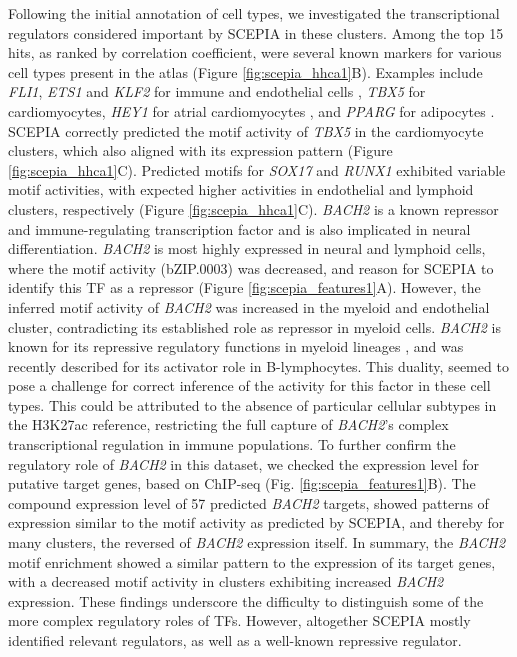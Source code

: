 Following the initial annotation of cell types, we investigated the transcriptional regulators considered important by SCEPIA in these clusters. Among the top 15 hits, as ranked by correlation coefficient, were several known markers for various cell types present in the atlas (Figure \ref{fig:scepia_hhca1}B). Examples include \textit{FLI1}, \textit{ETS1} and \textit{KLF2} for immune and endothelial cells \cite{Meadows2009,Zhao2018,BenDavid2022}, \textit{TBX5} for cardiomyocytes\cite{Steimle2017,Siatra2023}, \textit{HEY1} for atrial cardiomyocytes \cite{Kokubo2007}, and \textit{PPARG} for adipocytes \cite{Ma2018}. SCEPIA correctly predicted the motif activity of \textit{TBX5} in the cardiomyocyte clusters, which also aligned with its expression pattern (Figure \ref{fig:scepia_hhca1}C). Predicted motifs for \textit{SOX17} and \textit{RUNX1} exhibited variable motif activities, with expected higher activities in endothelial and lymphoid clusters, respectively (Figure \ref{fig:scepia_hhca1}C)\cite{Lee2014,Schachterle2017,Sood2017}. \textit{BACH2} is a known repressor and immune-regulating transcription factor and is also implicated in neural differentiation\cite{Hoshino2002,Liu2022}. \textit{BACH2} is most highly expressed in neural and lymphoid cells, where the motif activity (bZIP.0003) was decreased, and reason for SCEPIA to identify this TF as a repressor (Figure \ref{fig:scepia_features1}A). However, the inferred motif activity of \textit{BACH2} was increased in the myeloid and endothelial cluster, contradicting its established role as repressor in myeloid cells. \textit{BACH2} is known for its repressive regulatory functions in myeloid lineages \cite{ItohNakadai2014}, and was recently described for its activator role in B-lymphocytes\cite{Ochiai2022}. This duality, seemed to pose a challenge for  correct inference of the activity for this factor in these cell types. This could be attributed to the absence of particular cellular subtypes in the H3K27ac reference, restricting the full capture of \textit{BACH2}'s complex  transcriptional regulation in immune populations. To further confirm the regulatory role of \textit{BACH2} in this dataset, we checked the expression level for putative target genes, based on ChIP-seq (Fig. \ref{fig:scepia_features1}B). The compound expression level of 57 predicted \textit{BACH2} targets, showed patterns of expression similar to the motif activity as predicted by SCEPIA, and thereby for many clusters, the reversed of \textit{BACH2} expression itself. In summary, the \textit{BACH2} motif enrichment showed a similar pattern to the expression of its target genes, with a decreased motif activity in clusters exhibiting increased \textit{BACH2} expression. These findings underscore the difficulty to distinguish some of the more complex regulatory roles of TFs. However, altogether SCEPIA mostly identified relevant regulators, as well as a well-known repressive regulator.

